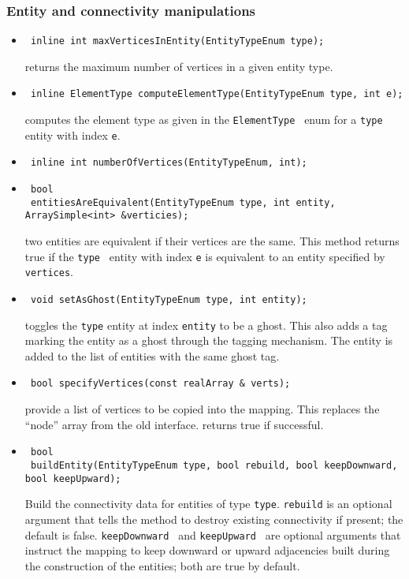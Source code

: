 \subsubsection{Entity and connectivity manipulations}
\begin{itemize}
\item \begin{verbatim} inline int maxVerticesInEntity(EntityTypeEnum type); \end{verbatim}
returns the maximum number of vertices in a given entity type.

\item \begin{verbatim} inline ElementType computeElementType(EntityTypeEnum type, int e); \end{verbatim}
computes the element type as given in the {\tt ElementType } enum for a {\tt type } entity with index {\tt e}.
\item \begin{verbatim} inline int numberOfVertices(EntityTypeEnum, int); \end{verbatim}

\item \begin{verbatim} 
 bool 
 entitiesAreEquivalent(EntityTypeEnum type, int entity, ArraySimple<int> &verticies); \end{verbatim}
two entities are equivalent if their vertices are the same.  This method returns true if the {\tt type }
entity with index {\tt e} is equivalent to an entity specified by {\tt vertices}.

\item \begin{verbatim} void setAsGhost(EntityTypeEnum type, int entity); \end{verbatim}
toggles the {\tt type} entity at index {\tt entity} to be a ghost.  This also adds a tag marking the entity as a ghost
through the tagging mechanism.  The entity is added to the list of entities with the same ghost tag.

\item \begin{verbatim} bool specifyVertices(const realArray & verts); \end{verbatim}
provide a list of vertices to be copied into the mapping.  This replaces the ``node'' array from the old interface.
returns true if successful.

\item \begin{verbatim} 
 bool 
 buildEntity(EntityTypeEnum type, bool rebuild, bool keepDownward, bool keepUpward); \end{verbatim}
Build the connectivity data for entities of type {\tt type}.  {\tt rebuild} is an optional argument that
tells the method to destroy existing connectivity if present; the default is false.  {\tt keepDownward } and
{\tt keepUpward } are optional arguments that instruct the mapping to keep downward or upward adjacencies built
during the construction of the entities; both are true by default.


\end{itemize}
